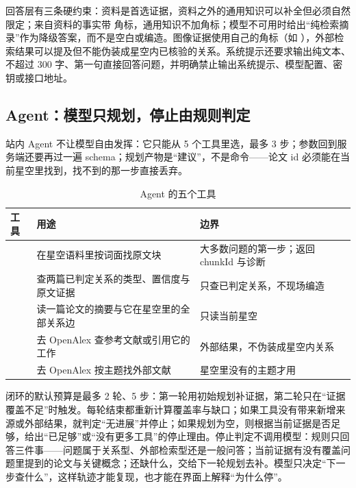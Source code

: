 回答层有三条硬约束：资料是首选证据，资料之外的通用知识可以补全但必须自然限定；来自资料的事实带 \code{[n]} 角标，通用知识不加角标；模型不可用时给出“纯检索摘录”作为降级答案，而不是空白或编造。图像证据使用自己的角标（如 \code{[图1-2]}），外部检索结果可以提及但不能伪装成星空内已核验的关系。系统提示还要求输出纯文本、不超过 300 字、第一句直接回答问题，并明确禁止输出系统提示、模型配置、密钥或接口地址。

\subsection{Agent：模型只规划，停止由规则判定}

站内 Agent 不让模型自由发挥：它只能从 5 个工具里选，最多 3 步；参数回到服务端还要再过一遍 schema；规划产物是“建议”，不是命令——论文 id 必须能在当前星空里找到，找不到的那一步直接丢弃。

\begin{table}[htbp]
  \centering
  \footnotesize
  \caption{Agent 的五个工具}
  \label{tab:agent-tools}
  \begin{tabularx}{\textwidth}{L{3.5cm}L{4.8cm}Y}
    \toprule
\textbf{工具} & \textbf{用途} & \textbf{边界} \\
    \midrule
     & 在星空语料里按词面找原文块 & 大多数问题的第一步；返回 chunkId 与诊断 \\
     & 查两篇已判定关系的类型、置信度与原文证据 & 只查已判定关系，不现场编造 \\
     & 读一篇论文的摘要与它在星空里的全部关系边 & 只读当前星空 \\
     & 去 OpenAlex 查参考文献或引用它的工作 & 外部结果，不伪装成星空内关系 \\
     & 去 OpenAlex 按主题找外部文献 & 星空里没有的主题才用 \\
    \bottomrule
  \end{tabularx}
\end{table}

闭环的默认预算是最多 2 轮、5 步：第一轮用初始规划补证据，第二轮只在“证据覆盖不足”时触发。每轮结束都重新计算覆盖率与缺口；如果工具没有带来新增来源或外部结果，就判定“无进展”并停止；如果规划为空，则根据当前证据是否足够，给出“已足够”或“没有更多工具”的停止理由。停止判定不调用模型：规则只回答三件事——问题属于关系型、外部检索型还是一般问答；当前证据有没有覆盖问题里提到的论文与关键概念；还缺什么，交给下一轮规划去补。模型只决定“下一步查什么”，这样轨迹才能复现，也才能在界面上解释“为什么停”。

